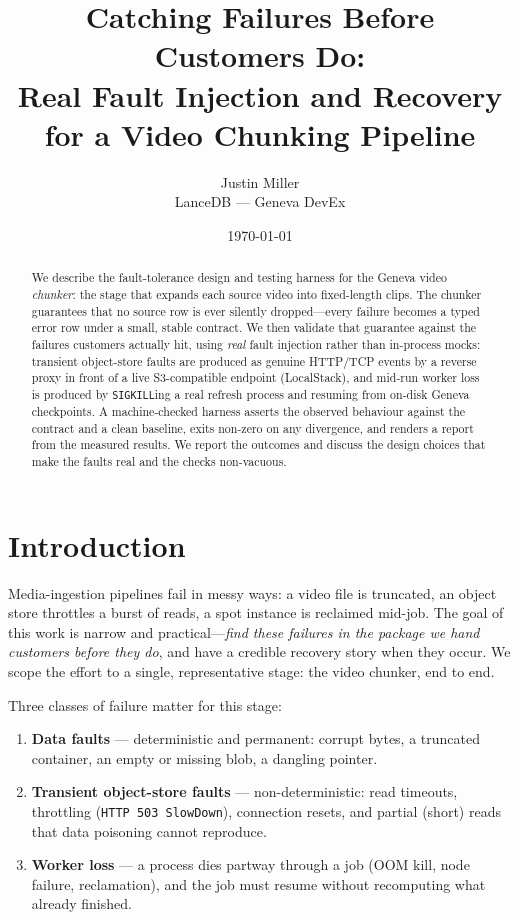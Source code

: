 \documentclass[11pt]{article}
\title{\vspace{-1.5em}Catching Failures Before Customers Do:\\
Real Fault Injection and Recovery for a Video Chunking Pipeline}
\author{Justin Miller\\\small LanceDB --- Geneva DevEx}
\date{\today}
\newcommand{\ct}[1]{\texttt{\small #1}}
\begin{document}
\maketitle
\vspace{-1.2em}

\begin{abstract}
\noindent
We describe the fault-tolerance design and testing harness for the Geneva video
\emph{chunker}: the stage that expands each source video into fixed-length clips.
The chunker guarantees that no source row is ever silently dropped---every
failure becomes a typed error row under a small, stable contract. We then
validate that guarantee against the failures customers actually hit, using
\emph{real} fault injection rather than in-process mocks: transient object-store
faults are produced as genuine HTTP/TCP events by a reverse proxy in front of a
live S3-compatible endpoint (LocalStack), and mid-run worker loss is produced by
\ct{SIGKILL}ing a real refresh process and resuming from on-disk Geneva
checkpoints. A machine-checked harness asserts the observed behaviour against the
contract and a clean baseline, exits non-zero on any divergence, and renders a
report from the measured results. We report the outcomes and discuss the design
choices that make the faults real and the checks non-vacuous.
\end{abstract}

\section{Introduction}

Media-ingestion pipelines fail in messy ways: a video file is truncated, an
object store throttles a burst of reads, a spot instance is reclaimed mid-job.
The goal of this work is narrow and practical---\emph{find these failures in the
package we hand customers before they do}, and have a credible recovery story
when they occur. We scope the effort to a single, representative stage: the
video chunker, end to end.

Three classes of failure matter for this stage:

\begin{enumerate}[itemsep=1pt,topsep=2pt]
  \item \textbf{Data faults} --- deterministic and permanent: corrupt bytes, a
  truncated container, an empty or missing blob, a dangling pointer.
  \item \textbf{Transient object-store faults} --- non-deterministic: read
  timeouts, throttling (\ct{HTTP 503 SlowDown}), connection resets, and partial
  (short) reads that data poisoning cannot reproduce.
  \item \textbf{Worker loss} --- a process dies partway through a job (OOM kill,
  node failure, reclamation), and the job must resume without recomputing what
  already finished.
\end{enumerate}
\end{document}
